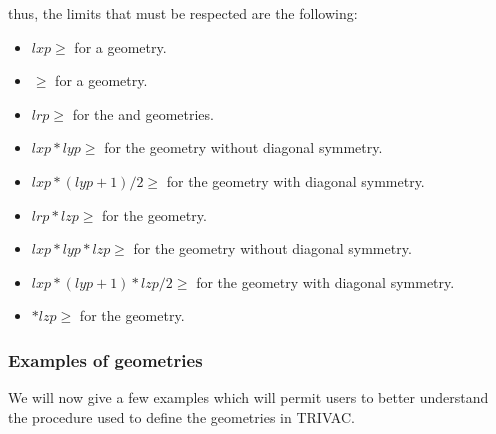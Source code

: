 \noindent
thus, the limits that must be respected are the following:

\begin{itemize}

\item $lxp\ge$ for a  geometry.

\item {}$\ge$ for a  geometry.

\item $lrp\ge$ for the  and  geometries.

\item $lxp*lyp\ge$ for the  geometry without diagonal symmetry. 

\item $lxp*(lyp+1)/2\ge$ for the  geometry with diagonal symmetry. 

\item $lrp*lzp\ge$ for the  geometry.

\item $lxp*lyp*lzp\ge$ for the  geometry without diagonal symmetry. 

\item $lxp*(lyp+1)*lzp/2\ge$ for the  geometry with diagonal symmetry. 

\item {}$*lzp\ge$ for the  geometry.

\end{itemize}

\vskip 0.2cm

\subsubsection{Examples of geometries}

We will now give a few examples which will permit users to better understand the procedure used to define the geometries in TRIVAC.

